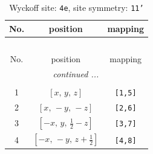 \documentclass[fleqn,8pt]{jsarticle}
\begin{document}
\begin{longtable}{ccc}
\caption{Wyckoff site: {\tt 4e}, site symmetry: {\tt 11'}}
 \\
 \hline \hline
No. & position & mapping \\ \hline \endfirsthead

\multicolumn{2}{l}{\tablename\ \thetable{}} \\
 \hline \hline
No. & position & mapping \\ \hline \endhead

 \hline \hline
\multicolumn{2}{r}{\footnotesize\it continued ...} \\ \endfoot

 \hline \hline
\multicolumn{2}{r}{} \\ \endlastfoot

1 & $\left[ x,\, y,\, z \right]$ & {\tt [1,5]} \\ \hline
2 & $\left[ x,\, - y,\, - z \right]$ & {\tt [2,6]} \\ \hline
3 & $\left[ - x,\, y,\, \frac{1}{2} - z \right]$ & {\tt [3,7]} \\ \hline
4 & $\left[ - x,\, - y,\, z + \frac{1}{2} \right]$ & {\tt [4,8]} \\
\end{longtable}
\end{document}
